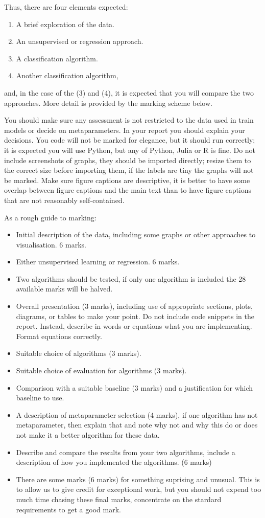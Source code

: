 \documentclass[12pt]{article}
\begin{document}
Thus, there are four elements expected:
\begin{enumerate}
\item A brief exploration of the data.
\item An unsupervised or regression approach.
\item A classification algorithm.
\item Another classification algorithm,
\end{enumerate}
and, in the case of the (3) and (4), it is expected that you will
compare the two approaches. More detail is provided by the marking
scheme below.

You should make sure any assessment is not restricted to the data used
in train models or decide on metaparameters. In your report you should
explain your decisions. You code will not be marked for elegance, but
it should run correctly; it is expected you will use Python, but any
of Python, Julia or R is fine. Do not include screenshots of graphs,
they should be imported directly; resize them to the correct size
before importing them, if the labels are tiny the graphs will not be
marked. Make sure figure captions are descriptive, it is better to
have some overlap between figure captions and the main text than to
have figure captions that are not reasonably self-contained.

As a rough guide to marking:
\begin{itemize}
\item Initial description of the data, including some graphs or other approaches to visualisation. 6 marks.
\item Either unsupervised learning or regression. 6 marks.
\item Two algorithms should be tested, if only one algorithm is
  included the 28 available marks will be halved.
\item Overall presentation (3 marks), including use of appropriate
  sections, plots, diagrams, or tables to make your point. Do not
  include code snippets in the report. Instead, describe in words or
  equations what you are implementing. Format equations correctly.
\item Suitable choice of algorithms (3 marks).
\item Suitable choice of evaluation for algorithms (3 marks).
\item Comparison with a suitable baseline (3 marks) and a justification for which baseline to use.
\item A description of metaparameter selection (4 marks), if one
  algorithm has not metaparameter, then explain that and note why not
  and why this do or does not make it a better algorithm for these
  data.
\item Describe and compare the results from your two algorithms,
  include a description of how you implemented the algorithms. (6 marks)
\item There are some marks (6 marks) for something suprising and
  unusual. This is to allow us to give credit for exceptional work,
  but you should not expend too much time chasing these final marks,
  concentrate on the stardard requirements to get a good mark.
\end{itemize}
\end{document}
